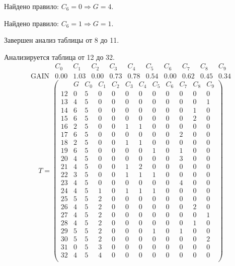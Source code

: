Найдено правило: $C_{6} = 0 \Longrightarrow G = 4$.

Найдено правило: $C_{6} = 1 \Longrightarrow G = 1$.

Завершен анализ таблицы от 8 до 11.

Анализируется таблица от 12 до 32.
$$ 
\begin{array}{lc|c|cccccccc}
	  & C_{0} & C_{1} & C_{2} & C_{3} & C_{4} & C_{5} & C_{6} & C_{7} & C_{8} & C_{9}\\
 \textrm{GAIN} & 0.00 & 1.03 & 0.00 & 0.73 & 0.78 & 0.54 & 0.00 & 0.62 & 0.45 & 0.34
\end{array}
 $$
$$
T = \left( \begin{array}{lcc|c|cccccccc}
	 & G & C_{0} & C_{1} & C_{2} & C_{3} & C_{4} & C_{5} & C_{6} & C_{7} & C_{8} & C_{9}\\
	12 & 0 & 5 & 0 & 0 & 0 & 0 & 0 & 0 & 0 & 0 & 0\\
	13 & 4 & 5 & 0 & 0 & 0 & 0 & 0 & 0 & 0 & 0 & 1\\
	14 & 6 & 5 & 0 & 0 & 0 & 0 & 0 & 0 & 0 & 1 & 0\\
	15 & 6 & 5 & 0 & 0 & 0 & 0 & 0 & 0 & 0 & 2 & 0\\
	16 & 2 & 5 & 0 & 0 & 1 & 1 & 0 & 0 & 0 & 0 & 0\\
	17 & 6 & 5 & 0 & 0 & 0 & 0 & 0 & 0 & 2 & 0 & 0\\
	18 & 2 & 5 & 0 & 0 & 1 & 1 & 0 & 0 & 0 & 0 & 0\\
	19 & 6 & 5 & 0 & 0 & 0 & 0 & 1 & 0 & 1 & 0 & 0\\
	20 & 4 & 5 & 0 & 0 & 0 & 0 & 0 & 0 & 3 & 0 & 0\\
	21 & 4 & 5 & 0 & 0 & 1 & 2 & 0 & 0 & 0 & 0 & 0\\
	22 & 3 & 5 & 0 & 0 & 1 & 1 & 1 & 0 & 0 & 0 & 0\\
	23 & 4 & 5 & 0 & 0 & 0 & 0 & 0 & 0 & 4 & 0 & 0\\
	24 & 4 & 5 & 1 & 0 & 1 & 1 & 1 & 0 & 0 & 0 & 0\\
	25 & 5 & 5 & 2 & 0 & 0 & 0 & 0 & 0 & 0 & 0 & 0\\
	26 & 4 & 5 & 2 & 0 & 0 & 0 & 0 & 0 & 0 & 2 & 0\\
	27 & 4 & 5 & 2 & 0 & 0 & 0 & 0 & 0 & 0 & 0 & 1\\
	28 & 4 & 5 & 2 & 0 & 0 & 0 & 0 & 0 & 0 & 1 & 0\\
	29 & 5 & 5 & 2 & 0 & 0 & 0 & 1 & 0 & 1 & 0 & 0\\
	30 & 5 & 5 & 2 & 0 & 0 & 0 & 0 & 0 & 0 & 0 & 2\\
	31 & 0 & 5 & 3 & 0 & 0 & 0 & 0 & 0 & 0 & 0 & 0\\
	32 & 4 & 5 & 4 & 0 & 0 & 0 & 0 & 0 & 0 & 0 & 0\\
\end{array} \right)
$$

